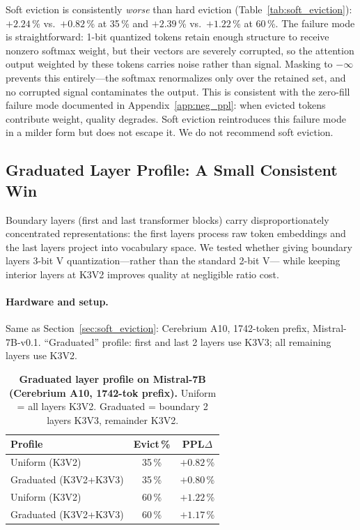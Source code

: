 \documentclass{article}
\begin{document}
Soft eviction is consistently \emph{worse} than hard eviction (Table~\ref{tab:soft_eviction}):
$+2.24$\,\% vs.\ $+0.82$\,\% at 35\,\% and $+2.39$\,\% vs.\ $+1.22$\,\% at 60\,\%.
The failure mode is straightforward: 1-bit quantized tokens retain enough structure
to receive nonzero softmax weight, but their vectors are severely corrupted, so
the attention output weighted by these tokens carries noise rather than signal.
Masking to $-\infty$ prevents this entirely---the softmax renormalizes only over
the retained set, and no corrupted signal contaminates the output.
This is consistent with the zero-fill failure mode documented in
Appendix~\ref{app:neg_ppl}: when evicted tokens contribute weight, quality
degrades. Soft eviction reintroduces this failure mode in a milder form but
does not escape it. We do not recommend soft eviction.

\subsection{Graduated Layer Profile: A Small Consistent Win}
\label{sec:graduated}

Boundary layers (first and last transformer blocks) carry disproportionately
concentrated representations: the first layers process raw token embeddings
and the last layers project into vocabulary space. We tested whether
giving boundary layers 3-bit V quantization---rather than the standard 2-bit V---
while keeping interior layers at K3V2 improves quality at negligible ratio cost.

\paragraph{Hardware and setup.}
Same as Section~\ref{sec:soft_eviction}: Cerebrium A10, 1742-token prefix,
Mistral-7B-v0.1. ``Graduated'' profile: first and last 2 layers use K3V3;
all remaining layers use K3V2.

\begin{table}[h]
\centering
\caption{\textbf{Graduated layer profile on Mistral-7B
  (Cerebrium A10, 1742-tok prefix).} Uniform = all layers K3V2.
  Graduated = boundary 2 layers K3V3, remainder K3V2.}
\label{tab:graduated}
\begin{tabular}{@{}lcc@{}}
\toprule
Profile & Evict\,\% & PPL$\Delta$ \\
\midrule
Uniform (K3V2)        & 35\,\% & $+0.82$\,\% \\
Graduated (K3V2+K3V3) & 35\,\% & $+0.80$\,\% \\
\midrule
Uniform (K3V2)        & 60\,\% & $+1.22$\,\% \\
Graduated (K3V2+K3V3) & 60\,\% & $+1.17$\,\% \\
\bottomrule
\end{tabular}
\end{table}
\end{document}

